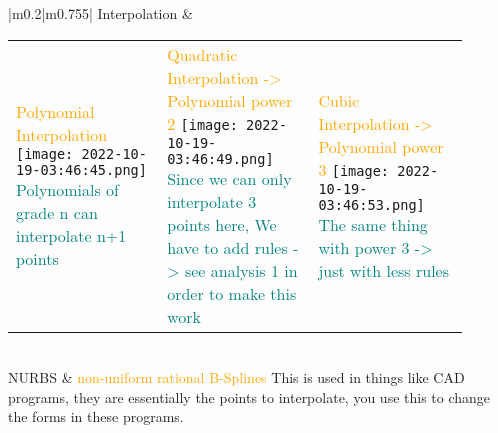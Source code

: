 \documentclass[main.tex,fontsize=8pt,paper=a4,paper=portrait,DIV=calc,]{scrartcl}
\begin{document}
\begin{table}[ht!]
\begin{tabular}{|m{0.2\linewidth}|m{0.755\linewidth}|}
\hline
Interpolation & 
\begin{tabular}{m{0.3\linewidth}m{0.3\linewidth}m{0.3\linewidth}}
\textcolor{orange}{Polynomial Interpolation}\newline
\texttt{[image: 2022-10-19-03:46:45.png]}\newline
\textcolor{teal}{Polynomials of grade n can interpolate n+1 points}
&
\textcolor{orange}{Quadratic Interpolation -> Polynomial power 2}\newline
\texttt{[image: 2022-10-19-03:46:49.png]}\newline
\textcolor{teal}{Since we can only interpolate 3 points here,\newline
We have to add rules -> see analysis 1 in order to make this work}
&
\textcolor{orange}{Cubic Interpolation -> Polynomial power 3}\newline
\texttt{[image: 2022-10-19-03:46:53.png]}\newline
\textcolor{teal}{The same thing with power 3 -> just with less rules}
\\
\end{tabular}\\
\hline
NURBS & 
\textcolor{orange}{non-uniform rational B-Splines}\newline
This is used in things like CAD programs, they are essentially the points to interpolate,\newline
you use this to change the forms in these programs.\\
\hline

\hline

\hline

\hline

\hline

\hline

\hline
\end{tabular}
\end{table}
\end{document}
